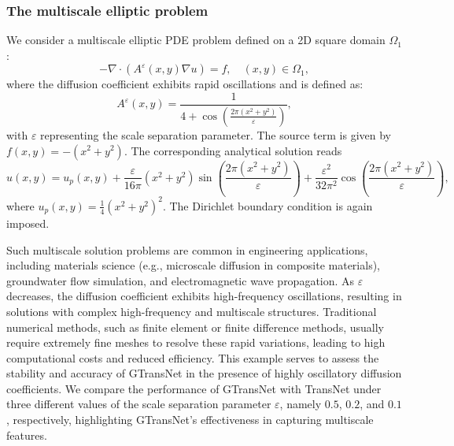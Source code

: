 \documentclass{article}
\begin{document}
\subsubsection{The multiscale elliptic problem}
We consider a  multiscale elliptic PDE problem defined on a 2D square domain $\Omega_1$:
\begin{equation}\label{eq:multiscale}
    -\nabla \cdot \left( A^{\varepsilon}(x,y) \nabla u \right) = f, \quad (x,y) \in \Omega_1, 
\end{equation}
where the diffusion coefficient exhibits rapid oscillations and is defined as:
\begin{equation}
A^{\varepsilon}(x,y) = \frac{1}{4 + \cos\left(\frac{2\pi (x^2 + y^2)}{\varepsilon}\right)},
\end{equation}
with \(\varepsilon\) representing the scale separation parameter. The source term is given by
$f(x,y) = - (x^2 + y^2)$.
The corresponding analytical solution reads
\begin{equation}
\textstyle
u(x,y) = u_p(x,y) + \frac{\varepsilon}{16 \pi}(x^2 + y^2) \sin\left(\frac{2\pi (x^2 + y^2)}{\varepsilon}\right) + \frac{\varepsilon^2}{32 \pi^2} \cos\left(\frac{2\pi (x^2 + y^2)}{\varepsilon}\right),
\end{equation}
where $u_p(x,y) = \frac14(x^2+y^2)^2$. The Dirichlet boundary condition is again  imposed.

Such multiscale solution problems are common in engineering applications, including materials science (e.g., microscale diffusion in composite materials), groundwater flow simulation, and electromagnetic wave propagation. As $\varepsilon$ decreases, the diffusion coefficient exhibits high-frequency oscillations, resulting in solutions with complex high-frequency and multiscale structures. Traditional numerical methods, such as finite element or finite difference methods, usually require extremely fine meshes to resolve these rapid variations, leading to high computational costs and reduced efficiency. This example serves to assess the stability and accuracy of GTransNet in the presence of highly oscillatory diffusion coefficients.
We compare the performance of GTransNet with TransNet under three different values of the scale separation parameter $\varepsilon$, namely $0.5$, $0.2$, and $0.1$, respectively, highlighting GTransNet’s effectiveness in capturing multiscale features.
\end{document}
